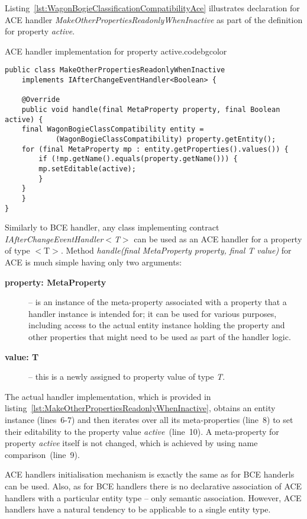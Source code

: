   Listing~\ref{lst:WagonBogieClassificationCompatibilityAce} illustrates declaration for ACE handler \emph{MakeOtherPropertiesReadonlyWhenInactive} as part of the definition for property \emph{active}.

  \begin{code}{ACE handler implementation for property active.}{\label{lst:MakeOtherPropertiesReadonlyWhenInactive}}{codebgcolor}
    \begin{lstlisting}
public class MakeOtherPropertiesReadonlyWhenInactive 
	implements IAfterChangeEventHandler<Boolean> {											

    @Override
    public void handle(final MetaProperty property, final Boolean active) {
	final WagonBogieClassCompatibility entity = 
		    (WagonBogieClassCompatibility) property.getEntity();
	for (final MetaProperty mp : entity.getProperties().values()) {
	    if (!mp.getName().equals(property.getName())) {
		mp.setEditable(active);
	    }
	}
    }
}
    \end{lstlisting}
  \end{code}

  Similarly to BCE handler, any class implementing contract \emph{IAfterChangeEventHandler$<$T$>$} can be used as an ACE handler for a property of type $<$T$>$.
  Method \emph{handle(final MetaProperty property, final T value)} for ACE is much simple having only two arguments:
  \begin{description}
    \item[\textbf{property: MetaProperty}] -- is an instance of the meta-property associated with a property that a handler instance is intended for; it can be used for various purposes, including access to the actual entity instance holding the property and other properties that might need to be used as part of the handler logic.
    \item[\textbf{value: T}] -- this is a newly assigned to property value of type \emph{T}.
  \end{description}
  The actual handler implementation, which is provided in listing~\ref{lst:MakeOtherPropertiesReadonlyWhenInactive}, obtains an entity instance (lines~6-7) and then iterates over all its meta-properties (line~8) to set their editability to the property value \emph{active}~(line~10).
  A meta-property for property \emph{active} itself is not changed, which is achieved by using name comparison~(line~9).

  ACE handlers initialisation mechanism is exactly the same as for BCE handerls can be used.
  Also, as for BCE handlers there is no declarative association of ACE handlers with a particular entity type -- only semantic association.
  However, ACE handlers have a natural tendency to be applicable to a single entity type.


